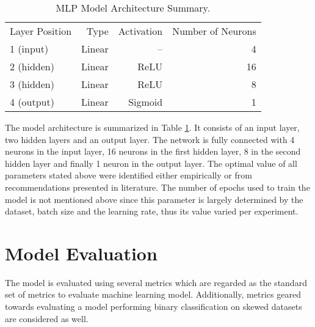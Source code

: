 \begin{table}[htb]
  \centering
  \begin{tabular}{lrrr}
    \hline
    Layer Position & Type & Activation & Number of Neurons \\
    1 (input) & Linear & -- & 4 \\
    2 (hidden) & Linear & ReLU & 16 \\
    3 (hidden) & Linear & ReLU & 8 \\
    4 (output) & Linear & Sigmoid & 1 \\
    \hline
  \end{tabular}
  \caption{MLP Model Architecture Summary.}
  \label{tab:mlp-model-arch}
\end{table}

The model architecture is summarized in Table
\ref{tab:mlp-model-arch}. It consists of an input layer, two hidden
layers and an output layer. The network is fully connected with 4
neurons in the input layer, 16 neurons in the first hidden layer, 8 in
the second hidden layer and finally 1 neuron in the output layer. The
optimal value of all parameters stated above were identified either
empirically or from recommendations presented in literature. The
number of epochs used to train the model is not mentioned above since
this parameter is largely determined by the dataset, batch size and
the learning rate, thus its value varied per experiment.

\section{Model Evaluation}
\label{sec:mlp-model-eval}

The model is evaluated using several metrics which are regarded as the
standard set of metrics to evaluate machine learning model.
Additionally, metrics geared towards evaluating a model performing
binary classification on skewed datasets are considered as well.

